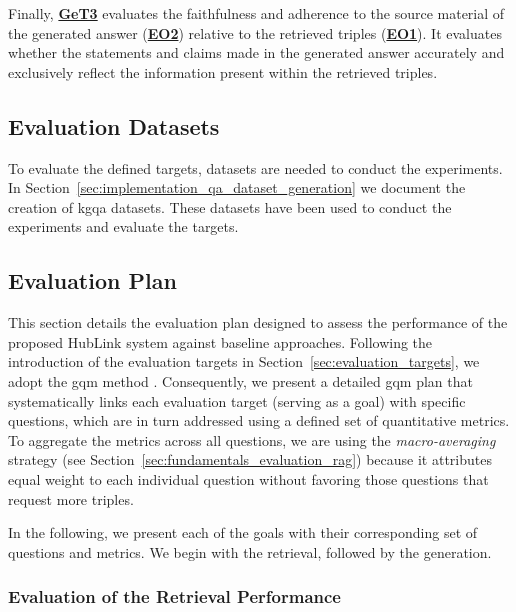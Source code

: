 Finally, \hyperref[enum:get3]{\textbf{GeT3}} evaluates the faithfulness and adherence to the source material of the generated answer (\hyperref[enum:get1]{\textbf{EO2}}) relative to the retrieved triples (\hyperref[enum:get1]{\textbf{EO1}}). It evaluates whether the statements and claims made in the generated answer accurately and exclusively reflect the information present within the retrieved triples. 

\subsection{Evaluation Datasets}
\label{sec:evaluation_datasets}

To evaluate the defined targets, datasets are needed to conduct the experiments. In Section~\ref{sec:implementation_qa_dataset_generation} we document the creation of \gls{kgqa} datasets. These datasets have been used to conduct the experiments and evaluate the targets.

\subsection{Evaluation Plan}
\label{sec:evaluation_goals_and_metrics}

This section details the evaluation plan designed to assess the performance of the proposed HubLink system against baseline approaches. Following the introduction of the evaluation targets in Section~\ref{sec:evaluation_targets}, we adopt the \gls{gqm} method \cite{basili_methodology_1984,basili_software_1992}. Consequently, we present a detailed \gls{gqm} plan that systematically links each evaluation target (serving as a goal) with specific questions, which are in turn addressed using a defined set of quantitative metrics. To aggregate the metrics across all questions, we are using the \emph{macro-averaging} strategy (see Section~\ref{sec:fundamentals_evaluation_rag}) because it attributes equal weight to each individual question without favoring those questions that request more triples.

In the following, we present each of the goals with their corresponding set of questions and metrics. We begin with the retrieval, followed by the generation.



\subsubsection{Evaluation of the Retrieval Performance} 

